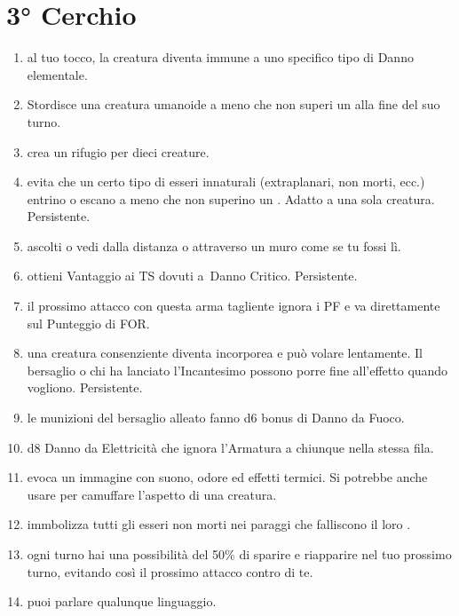 \documentclass[itdr]{subfiles}
\begin{document}
\section{3° Cerchio}
\def \spellcircle {3}
\begin{enumerate}
	\item {} al tuo tocco, la creatura diventa immune a uno specifico tipo di Danno elementale.
	\item {} Stordisce una creatura umanoide a meno che non superi un  alla fine del suo turno.
	\item {} crea un rifugio per dieci creature.
	\item {} evita che un certo tipo di esseri innaturali (extraplanari, non morti, ecc.) entrino o escano a meno che non superino un . Adatto a una sola creatura. Persistente.
	\item {} ascolti o vedi dalla distanza o attraverso un muro come se tu fossi lì.
	\item {} ottieni Vantaggio ai TS dovuti a~Danno Critico. Persistente.
	\item {} il prossimo attacco con questa arma tagliente ignora i PF e va direttamente sul Punteggio di FOR.
	\item {} una creatura consenziente diventa \mbox{incorporea} e può volare lentamente. Il bersaglio o chi ha lanciato l'Incantesimo possono porre fine all'effetto quando vogliono. Persistente.
	\item {} le munizioni del bersaglio alleato fanno d6 bonus di Danno da Fuoco.
	\item {} d8 Danno da Elettricità che ignora l'Armatura a chiunque nella stessa fila.
	\item {} evoca un immagine con suono, odore ed effetti termici. Si potrebbe anche usare per camuffare l'aspetto di una creatura.
	\item {} immbolizza tutti gli esseri non morti nei paraggi che falliscono il loro .
	\item {} ogni turno hai una possibilità del 50\% di sparire e riapparire nel tuo prossimo turno, evitando così il prossimo attacco contro di te.
	\item {} puoi parlare qualunque linguaggio.

\end{enumerate}
\end{document}
